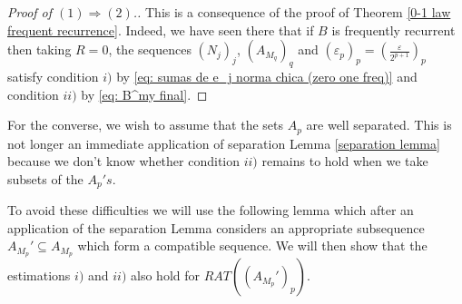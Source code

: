 \documentclass[11pt]{amsart}
\newcommand{\sub}{\subseteq}
\begin{document}
\begin{proof}[Proof of $(1)\Rightarrow (2)$.] 
     This is a consequence of the proof of Theorem \ref{0-1 law frequent recurrence}. Indeed, we have seen there that if $B$ is frequently recurrent then taking $R=0$,  the sequences $(N_j)_j$, $(A_{M_q})_q$ and $(\varepsilon_p)_p=(\frac{\varepsilon}{2^{p+1}})_p$ satisfy condition $i)$ by \eqref{eq: sumas de e_j norma chica (zero one freq)} and condition $ii)$ by \eqref{eq: B^my final}.  
\end{proof}    

For the converse, we wish to assume that the sets $A_p$ are well separated. This is not longer an immediate application of separation Lemma \ref{separation lemma} because we don't know whether condition $ii)$ remains to hold when we take subsets of the $A_p's$.


To avoid these difficulties we will use the following lemma which after an application of the separation Lemma considers an appropriate subsequence $A_{M_p}'\sub A_{M_p}$ which form a compatible sequence. We will then show that the estimations $i)$ and  $ii)$ also hold for $RAT((A_{M_p}')_p)$.
\end{document}
